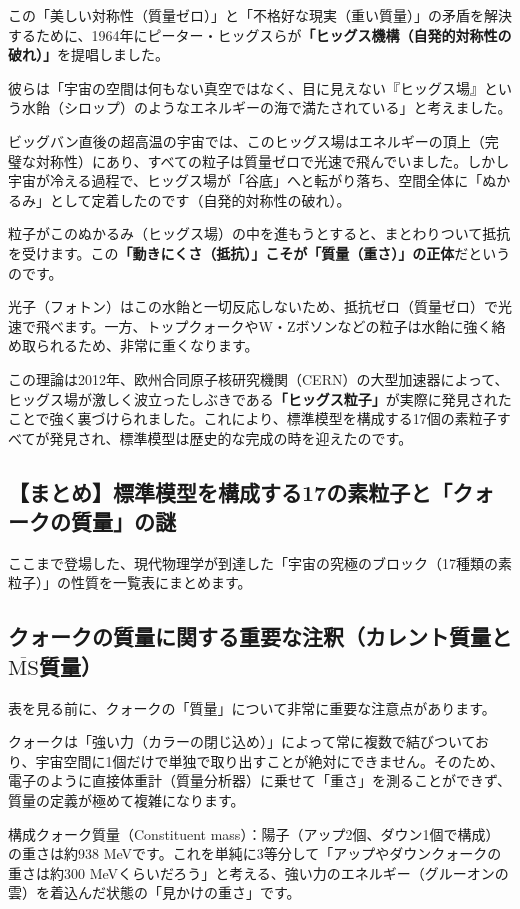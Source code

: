 この「美しい対称性（質量ゼロ）」と「不格好な現実（重い質量）」の矛盾を解決するために、1964年にピーター・ヒッグスらが\textbf{「ヒッグス機構（自発的対称性の破れ）」}を提唱しました。

彼らは「宇宙の空間は何もない真空ではなく、目に見えない『ヒッグス場』という水飴（シロップ）のようなエネルギーの海で満たされている」と考えました。

ビッグバン直後の超高温の宇宙では、このヒッグス場はエネルギーの頂上（完璧な対称性）にあり、すべての粒子は質量ゼロで光速で飛んでいました。しかし宇宙が冷える過程で、ヒッグス場が「谷底」へと転がり落ち、空間全体に「ぬかるみ」として定着したのです（自発的対称性の破れ）。

粒子がこのぬかるみ（ヒッグス場）の中を進もうとすると、まとわりついて抵抗を受けます。この\textbf{「動きにくさ（抵抗）」こそが「質量（重さ）」の正体}だというのです。

光子（フォトン）はこの水飴と一切反応しないため、抵抗ゼロ（質量ゼロ）で光速で飛べます。一方、トップクォークやW・Zボソンなどの粒子は水飴に強く絡め取られるため、非常に重くなります。

この理論は2012年、欧州合同原子核研究機関（CERN）の大型加速器によって、ヒッグス場が激しく波立ったしぶきである\textbf{「ヒッグス粒子」}が実際に発見されたことで強く裏づけられました。これにより、標準模型を構成する17個の素粒子すべてが発見され、標準模型は歴史的な完成の時を迎えたのです。

\subsection{【まとめ】標準模型を構成する17の素粒子と「クォークの質量」の謎}

ここまで登場した、現代物理学が到達した「宇宙の究極のブロック（17種類の素粒子）」の性質を一覧表にまとめます。

\subsection{クォークの質量に関する重要な注釈（カレント質量と\(\overline{\mathrm{MS}}\)質量）}

表を見る前に、クォークの「質量」について非常に重要な注意点があります。

クォークは「強い力（カラーの閉じ込め）」によって常に複数で結びついており、宇宙空間に1個だけで単独で取り出すことが絶対にできません。そのため、電子のように直接体重計（質量分析器）に乗せて「重さ」を測ることができず、質量の定義が極めて複雑になります。

構成クォーク質量（Constituent mass）：陽子（アップ2個、ダウン1個で構成）の重さは約938 MeVです。これを単純に3等分して「アップやダウンクォークの重さは約300 MeVくらいだろう」と考える、強い力のエネルギー（グルーオンの雲）を着込んだ状態の「見かけの重さ」です。

